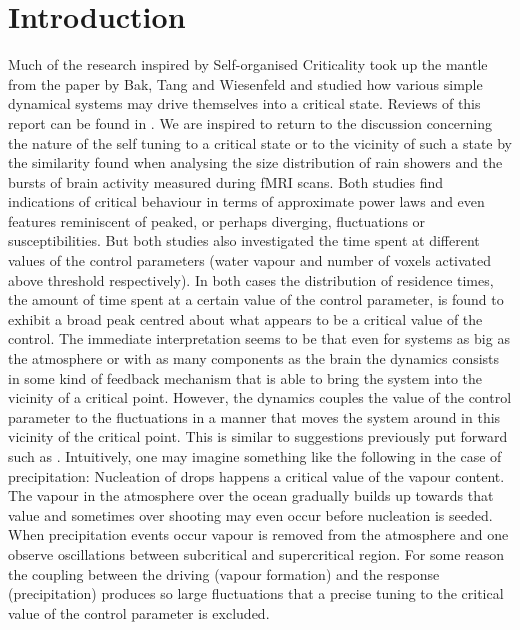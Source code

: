 \documentclass[aps,prl,showpacs,superscriptaddress,groupedaddress,notitlepage]{revtex4-1}
\begin{document}
\section{Introduction}
Much of the research inspired by Self-organised Criticality took up the  mantle from the paper by Bak, Tang and Wiesenfeld\cite{BTW1987} and studied how various simple dynamical systems may drive themselves into a critical state. Reviews of this report can be found in \cite{Jensen1998,Gunnar_Book,25Years}. We are inspired to return to the discussion concerning the nature of the self tuning to a critical state or to the vicinity of such a  state by the similarity found when analysing the size distribution of rain showers \cite{Peters_Neelin2006} and the bursts of brain activity measured during fMRI scans\cite{Chialvo2012}. Both studies find indications of critical behaviour in terms of approximate power laws and even features reminiscent of peaked, or perhaps diverging, fluctuations or susceptibilities. But both studies also investigated the time spent at different values of the control parameters (water vapour and number of voxels activated above threshold respectively). In both cases the distribution of residence times, the amount of time spent at a certain value of the control parameter, is found to exhibit a broad peak centred about what appears to be a critical value of the control. The immediate interpretation seems to be that even for systems as big as the atmosphere or with as many components as the brain the dynamics consists in some kind of feedback mechanism that is able to bring the system into the vicinity of a critical point. However, the dynamics couples the value of the control parameter to the fluctuations in a manner that moves the system around in this vicinity of the critical point. This is similar to suggestions previously put forward such as \cite{Zapperi1995,Sornette1992}. Intuitively, one may imagine something like the following in the case of precipitation: Nucleation of drops happens a critical value of the vapour content. The vapour in the atmosphere over the ocean gradually builds up towards that value and sometimes over shooting may even occur before nucleation is seeded. When precipitation events occur vapour is removed from the atmosphere and one observe oscillations between subcritical and supercritical region. For some reason the coupling between the driving (vapour formation) and the response (precipitation) produces so large  fluctuations that a precise tuning to the critical value of the control parameter is excluded. 
\end{document}
